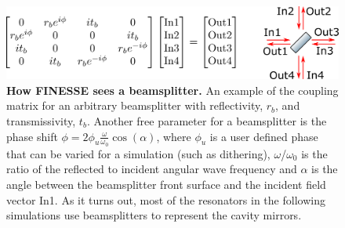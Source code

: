 	\begin{figure}[h]
		\centering
		\includegraphics[width=0.8 \textwidth]{../Figures/bs_matrix_pic.png}
		\caption[How FINESSE sees a beamsplitter.]
		{\textbf{How FINESSE sees a beamsplitter.} 	An example of the coupling matrix for an arbitrary beamsplitter with reflectivity, $r_b$, and transmissivity, $t_b$. Another free parameter for a beamsplitter is the phase shift $\phi = 2 \phi_u \frac{\omega}{\omega_0} \cos(\alpha)$, where $\phi_u$ is a user defined phase that can be varied for a simulation (such as dithering), $\omega$/$\omega_0$ is the ratio of the reflected to incident angular wave frequency and $\alpha$ is the angle between the beamsplitter front surface and the incident field vector In1.  As it turns out, most of the resonators in the following simulations use beamsplitters to represent the cavity mirrors.
		}
		\label{fig:FINESSE_bs}
	\end{figure}

